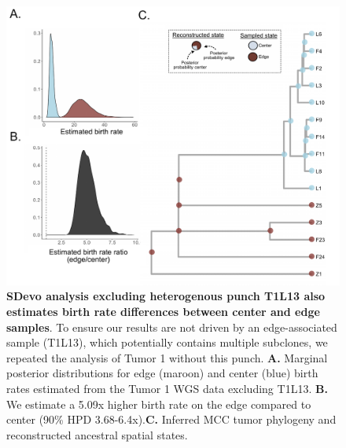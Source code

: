 \documentclass[12pt]{elife_based}
\begin{document}
\begin{figure}
\includegraphics[width=\textwidth]{figures/figS10_remove_subclonal_punch.pdf}
\caption{\textbf{SDevo analysis excluding heterogenous punch T1L13 also estimates birth rate differences between center and edge samples}. To ensure our results are not driven by an edge-associated sample (T1L13), which potentially contains multiple subclones, we repeated the analysis of Tumor 1 without this punch. \textbf{A.} Marginal posterior distributions for edge (maroon) and center (blue) birth rates estimated from the Tumor 1 WGS data excluding T1L13. \textbf{B.} We estimate a 5.09x higher birth rate on the edge compared to center (90\% HPD 3.68-6.4x).\textbf{C.} Inferred MCC tumor phylogeny and reconstructed ancestral spatial states.} 
\label{figsupp:sf5-6}
\end{figure} 
\end{document}
